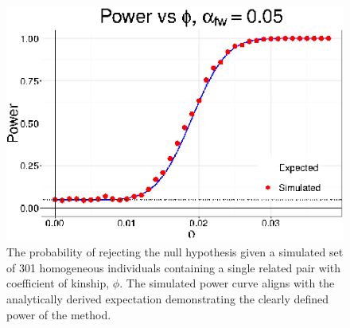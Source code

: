 \begin{figure}
\includegraphics[width=1\columnwidth]{./figures/power_curve}\caption[Power curve for detection of related pair]{The probability of rejecting the null hypothesis given a simulated
set of 301 homogeneous individuals containing a single related pair
with coefficient of kinship, $\phi$. The simulated power curve aligns
with the analytically derived expectation demonstrating the clearly
defined power of the method.}
\label{power_curve}
\end{figure}

